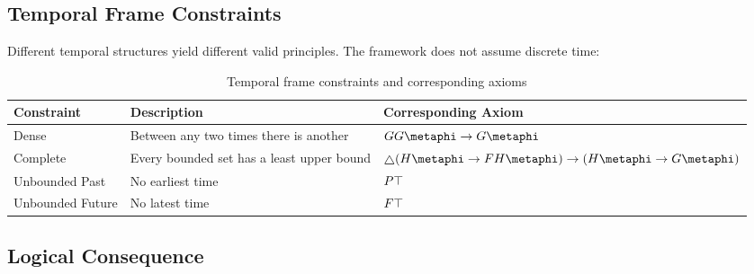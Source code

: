\documentclass[../LogosReference.tex]{subfiles}
\begin{document}


\subsection{Temporal Frame Constraints}\label{sec:temporal-constraints}

Different temporal structures yield different valid principles.
The framework does not assume discrete time:

\begin{table}[h]
	\centering
	\begin{tabular}{lll}
		\toprule
		\textbf{Constraint} & \textbf{Description}                      & \textbf{Corresponding Axiom}                                                                                    \\
		\midrule
		Dense               & Between any two times there is another    & $\allfuture\allfuture\metaphi \to \allfuture\metaphi$                                                        \\
		Complete            & Every bounded set has a least upper bound & $\always(\allpast\metaphi \to \somefuture\allpast\metaphi) \to (\allpast\metaphi \to \allfuture\metaphi)$ \\
		Unbounded Past      & No earliest time                          & $P\top$                                                                                                  \\
		Unbounded Future    & No latest time                            & $F\top$                                                                                               \\
		\bottomrule
	\end{tabular}
	\caption{Temporal frame constraints and corresponding axioms}
	\label{tab:temporal-constraints}
\end{table}


\subsection{Logical Consequence}\label{sec:logical-consequence-core}
\end{document}
